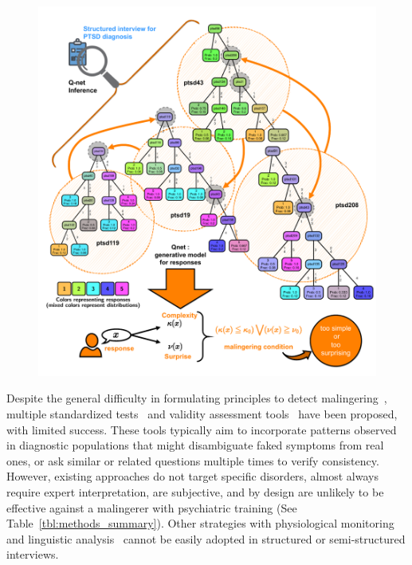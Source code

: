 \documentclass[onecolumn,10pt]{IEEEtran}
\newif\iftikzX
\begin{document}
\begin{figure}
  \tikzexternalenable
  \centering
  \iftikzX  
  
  \else
  \includegraphics[width=.92\textwidth]{Figures/External/scheme}
  \fi
 
  \vspace{-12pt}
  
  \label{figscheme}
\end{figure}

Despite the general difficulty in formulating principles to detect malingering~\cite{drob2009clinical}, multiple standardized tests~\cite{Wong2005,smith1997detection} and  validity assessment tools~\cite{ben2012interpreting} have been proposed, with limited success. These tools typically aim to incorporate patterns observed in diagnostic populations that might disambiguate faked symptoms from real ones, or ask similar or related questions multiple times to verify consistency. However,  existing approaches  do not target specific disorders, almost always require expert interpretation, are  subjective, and by design are  unlikely to be effective against a malingerer with psychiatric training (See Table~\ref{tbl:methods_summary}). Other  strategies with physiological monitoring and linguistic analysis~\cite{ekman1991who,mihalcea2009lie,burgoon2008cognitive,zhou2004automating}  cannot be easily  adopted  in structured or semi-structured interviews.
\end{document}
